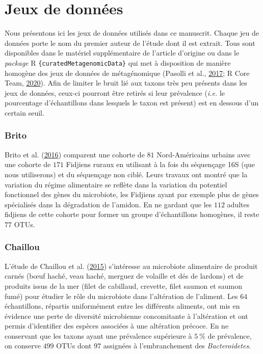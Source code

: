 \documentclass[12pt,a4paper]{reedthesis}
\theoremstyle{definition}
\theoremstyle{definition}
\theoremstyle{definition}
\theoremstyle{remark}
\begin{document}
\hypertarget{jeuxdonnees}{%
\section{Jeux de données}\label{jeuxdonnees}}

Nous présentons ici les jeux de données utilisés dans ce manuscrit. Chaque jeu de données porte le nom du premier auteur de l'étude dont il est extrait. Tous sont disponibles dans le matériel supplémentaire de l'article d'origine ou dans le \emph{package} R \texttt{\{curatedMetagenomicData\}} qui met à disposition de manière homogène des jeux de données de métagénomique (Pasolli et al., \protect\hyperlink{ref-pasolli2017accessible}{2017}; R Core Team, \protect\hyperlink{ref-r2020}{2020}). Afin de limiter le bruit lié aux taxons très peu présents dans les jeux de données, ceux-ci pourront être retirés si leur prévalence (\emph{i.e.} le pourcentage d'échantillons dans lesquels le taxon est présent) est en dessous d'un certain seuil.

\hypertarget{brito}{%
\subsubsection*{Brito}\label{brito}}

Brito et al. (\protect\hyperlink{ref-brito2016mobile}{2016}) comparent une cohorte de \(81\) Nord-Américains urbains avec une cohorte de \(171\) Fidjiens ruraux en utilisant à la fois du séquençage 16S (que nous utiliserons) et du séquençage non ciblé. Leurs travaux ont montré que la variation du régime alimentaire se reflète dans la variation du potentiel fonctionnel des gènes du microbiote, les Fidjiens ayant par exemple plus de gènes spécialisés dans la dégradation de l'amidon. En ne gardant que les \(112\) adultes fidjiens de cette cohorte pour former un groupe d'échantillons homogènes, il reste \(77\) OTUs.

\hypertarget{chaillou}{%
\subsubsection*{Chaillou}\label{chaillou}}

L'étude de Chaillou et al. (\protect\hyperlink{ref-chaillou2015origin}{2015}) s'intéresse au microbiote alimentaire de produit carnés (bœuf haché, veau haché, merguez de volaille et dés de lardons) et de produits issus de la mer (filet de cabillaud, crevette, filet saumon et saumon fumé) pour étudier le rôle du microbiote dans l'altération de l'aliment. Les \(64\) échantillons, répartis uniformément entre les différents aliments, ont mis en évidence une perte de diversité microbienne concomitante à l'altération et ont permis d'identifier des espèces associées à une altération précoce. En ne conservant que les taxons ayant une prévalence supérieure à \(5~\%\) de prévalence, on conserve \(499\) OTUs dont \(97\) assignées à l'embranchement des \emph{Bacteroidetes}.
\end{document}
